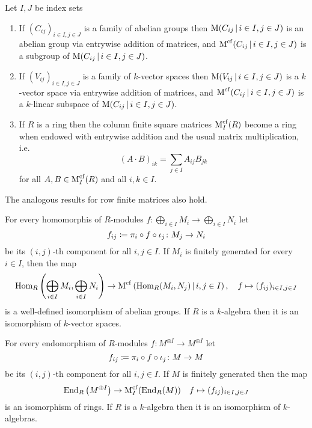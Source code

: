 \begin{lemma}
  \label{lemma: structure on infinite matrices}
  Let $I, J$ be index sets
  \begin{enumerate}
    \item
      If $(C_{ij})_{i \in I, j \in J}$ is a family of abelian groups then $\Mat(C_{ij} \suchthat i \in I, j \in J)$ is an abelian group via entrywise addition of matrices, and $\Mat^{\cf}(C_{ij} \suchthat i \in I, j \in J)$ is a subgroup of $\Mat(C_{ij} \suchthat i \in I, j \in J)$.
    \item
      If $(V_{ij})_{i \in I, j \in J}$ is a family of $k$-vector spaces then $\Mat(V_{ij} \suchthat i \in I, j \in J)$ is a $k$-vector space via entrywise addition of matrices, and $\Mat^{\cf}(C_{ij} \suchthat i \in I, j \in J)$ is a $k$-linear subspace of $\Mat(C_{ij} \suchthat i \in I, j \in J)$.
    \item
      If $R$ is a ring then the column finite square matrices $\operatorname{M}^{{\operatorname{cf}}}_I(R)$ become a ring when endowed with entrywise addition and the usual matrix multiplication, i.e.\
      \[
          (A \cdot B)_{ik}
        = \sum_{j \in I} A_{ij} B_{jk}
      \]
      for all $A, B \in \operatorname{M}^{{\operatorname{cf}}}_I(R)$ and all $i, k \in I$.
  \end{enumerate}
  The analogous results for row finite matrices also hold.
\end{lemma}


\begin{corollary}
  For every homomorphis of $R$-modules $f \colon \bigoplus_{i \in I} M_i \to \bigoplus_{i \in I} N_i$ let
  \[
              f_{ij}
    \coloneqq  \pi_i \circ f \circ \iota_j
    \colon    M_j
    \to       N_i
  \]
  be its $(i,j)$-th component for all $i, j \in I$.
  If $M_i$ is finitely generated for every $i \in I$, then the map
  \[
            \Hom_R\left( \bigoplus_{i \in I} M_i, \bigoplus_{i \in I} N_i \right)
    \to     \Mat^{\cf}\left( \Hom_R(M_i, N_j) \suchthat i,j \in I \right),
    \quad   f
    \mapsto (f_{ij})_{i \in I, j \in J}
  \]
  is a well-defined isomorphism of abelian groups.
  If $R$ is a $k$-algebra then it is an isomorphism of $k$-vector spaces.
\end{corollary}




\begin{corollary}
  \label{corollary: endomorphism ring of sum power of fg module}
  For every endomorphism of $R$-modules $f \colon M^{\oplus I} \to M^{\oplus I}$ let
  \[
              f_{ij}
    \coloneqq  \pi_i \circ f \circ \iota_j
    \colon    M
    \to       M
  \]
  be its $(i,j)$-th component for all $i, j \in I$.
  If $M$ is finitely generated then the map
    \[
            \operatorname{End}_R\left( M^{\oplus I} \right)
    \to     \operatorname{M}^{{\operatorname{cf}}}_I( \operatorname{End}_R(M) )
    \quad   f
    \mapsto (f_{ij})_{i \in I, j \in J}
  \]
  is an isomorphism of rings.
  If $R$ is a $k$-algebra then it is an isomorphism of $k$-algebras.
\end{corollary}







